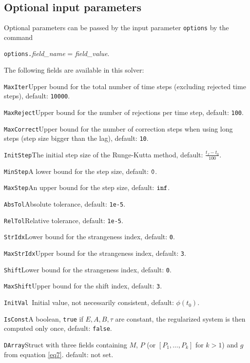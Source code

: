 \documentclass[final,reqno]{siamltex}
\renewenvironment{itemize}[1]{\begin{compactitem}#1}{\end{compactitem}}
\begin{document}
\subsection{Optional input parameters}
Optional parameters can be passed by the input parameter {\tt options} by the command
\begin{center}
{\tt options.}{\it field\_name} = {\it field\_value}.
\end{center}
The following fields are available in this solver:
\begin{itemize}
\item {\tt MaxIter}\quad        Upper bound for the total number of time steps (excluding
	rejected time steps), default: {\tt 10000}.
\item {\tt MaxReject}\quad      Upper bound for the number of rejections per time step, default: {\tt 100}.
\item{\tt MaxCorrect}\quad  Upper bound for the number of correction steps when using
         long steps (step size bigger than the lag), default: {\tt10}.
\item {\tt InitStep}\quad        The initial step size of the Runge-Kutta method, default: $\frac{t_f-t_0}{100}$.
\item {\tt MinStep}\quad         A lower bound for the step size, default: $\tt 0$.
\item {\tt MaxStep}\quad      An upper bound for the step size, default: $\tt inf$.
\item {\tt AbsTol}\quad       Absolute tolerance, default:  {\tt 1e-5}.
\item {\tt RelTol}\quad       Relative tolerance, default:  {\tt 1e-5}.
\item {\tt StrIdx}\quad       Lower bound for the strangeness index,  default: {\tt 0}.
\item {\tt MaxStrIdx}\quad    Upper bound for the strangeness index,  default: {\tt 3}.
\item {\tt Shift}\quad       Lower bound for the strangeness index,  default: {\tt 0}.
\item {\tt MaxShift}\quad    Upper bound for the shift index,  default: {\tt 3}.
\item {\tt InitVal  }\quad    Initial value, not necessarily consistent,  default: $\phi(t_0)$.
\item {\tt IsConst}\quad   A boolean, {\tt true} if $E,A,B,\tau$ are constant, the regularized system is then computed only once, default: {\tt false}.
\item {\tt DArray}\quad    Struct with three fields containing $M$, $P$ (or $[P_1,\ldots,P_k]$ for $k>1$) and $g$ from equation \eqref{eq7}.  default: not set.
\end{itemize}
\end{document}
